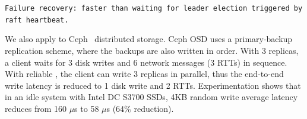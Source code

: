 \texttt{Failure recovery: faster than waiting for leader election triggered by raft heartbeat.}

We also apply \sys{} to Ceph~\cite{weil2006ceph} distributed storage. Ceph OSD uses a primary-backup replication scheme, where the backups are also written in order. With 3 replicas, a client waits for 3 disk writes and 6 network messages (3 RTTs) in sequence. With reliable \sys{}, the client can write 3 replicas in parallel, thus the end-to-end write latency is reduced to 1 disk write and 2 RTTs. Experimentation shows that in an idle system with Intel DC S3700 SSDs, 4KB random write average latency reduces from 160 $\mu$s to 58 $\mu$s (64\% reduction).







